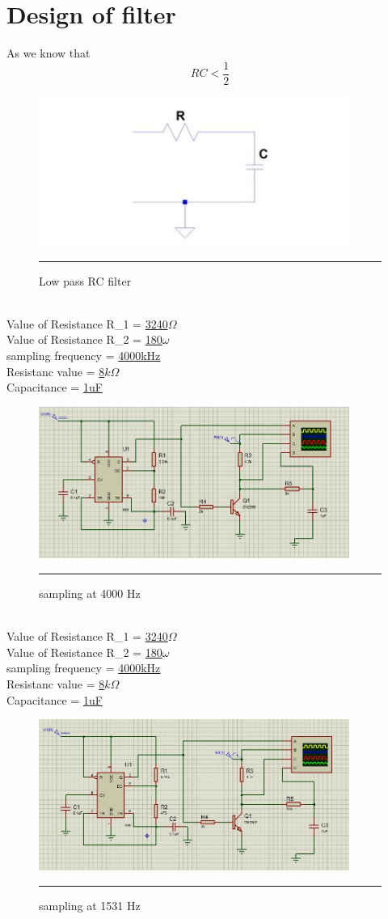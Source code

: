 \section{Design of filter}
As we know that 
  \[RC < \frac{1}{2} \]
  \begin{figure}[htbp]
	\centering
	\includegraphics[width = 4in]{./Figures/filter.jpg}
	\rule{35em}{0.5pt}
	\caption{Low pass RC filter}
\end{figure}
\\Value of Resistance R_1 = \underline{3240$\Omega$} 
\\Value of Resistance R_2 = \underline{180$\omega$} 
\\sampling frequency = \underline{4000kHz} 
\\Resistanc value = \underline{8$k\Omega$} 
\\Capacitance = \underline{1uF} 
	\begin{figure}[htbp]
	\centering
	\includegraphics[width = 4in]{./Figures/schematic1.jpg}
	\rule{35em}{0.5pt}
	\caption{sampling at 4000 Hz}
\end{figure}

\\Value of Resistance R_1 = \underline{3240$\Omega$} 
\\Value of Resistance R_2 = \underline{180$\omega$} 
\\sampling frequency = \underline{4000kHz} 
\\Resistanc value = \underline{8$k\Omega$} 
\\Capacitance = \underline{1uF} 
	\begin{figure}[htbp]
	\centering
	\includegraphics[width = 4in]{./Figures/schematic2.jpg}
	\rule{35em}{0.5pt}
	\caption{sampling at 1531 Hz}
\end{figure}